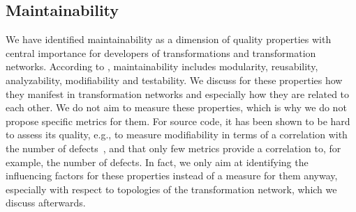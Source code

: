 \subsection{Maintainability}

We have identified maintainability as a dimension of quality properties with central importance for developers of transformations and transformation networks.
According to \cite{iso25010}, maintainability includes modularity, reusability, analyzability, modifiability and testability.
We discuss for these properties how they manifest in transformation networks and especially how they are related to each other.
We do not aim to measure these properties, which is why we do not propose specific metrics for them.
For source code, it has been shown to be hard to assess its quality, e.g., to measure modifiability in terms of a correlation with the number of defects~\cite{Gyimothy2005ValidationMetrics-TSE, Yu2002FaultPrediction-ECSMR}, and that only few metrics provide a correlation to, for example, the number of defects.
In fact, we only aim at identifying the influencing factors for these properties instead of a measure for them anyway, especially with respect to topologies of the transformation network, which we discuss afterwards.

